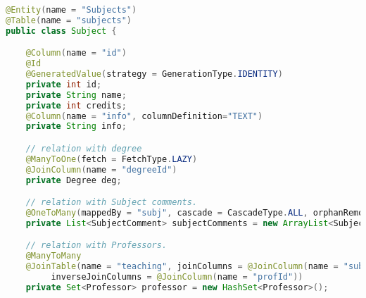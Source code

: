 \begin{lstlisting}[language=Java,  basicstyle=\footnotesize]
@Entity(name = "Subjects")
@Table(name = "subjects")
public class Subject {

	@Column(name = "id")
	@Id
	@GeneratedValue(strategy = GenerationType.IDENTITY)
	private int id;
	private String name;
	private int credits;
	@Column(name = "info", columnDefinition="TEXT")
	private String info;

	// relation with degree
	@ManyToOne(fetch = FetchType.LAZY)
	@JoinColumn(name = "degreeId")
	private Degree deg;

	// relation with Subject comments.
	@OneToMany(mappedBy = "subj", cascade = CascadeType.ALL, orphanRemoval = true)
	private List<SubjectComment> subjectComments = new ArrayList<SubjectComment>();

	// relation with Professors.
	@ManyToMany
	@JoinTable(name = "teaching", joinColumns = @JoinColumn(name = "subjectId"),
		 inverseJoinColumns = @JoinColumn(name = "profId"))
	private Set<Professor> professor = new HashSet<Professor>();
\end{lstlisting}